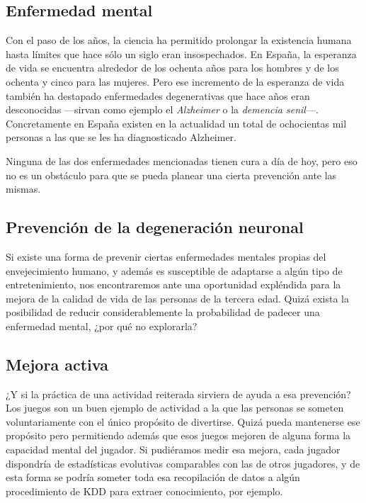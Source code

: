 \subsection{Enfermedad mental}

Con el paso de los años, la ciencia ha permitido prolongar la existencia humana hasta límites que hace sólo un siglo eran insospechados. En España, la esperanza de vida se encuentra alrededor de los ochenta años para los hombres y de los ochenta y cinco para las mujeres. Pero ese incremento de la esperanza de vida también ha destapado enfermedades degenerativas que hace años eran desconocidas ---sirvan como ejemplo el {\it Alzheimer} o la {\it demencia senil}---. Concretamente en España existen en la actualidad un total de ochocientas mil personas a las que se les ha diagnosticado Alzheimer.

Ninguna de las dos enfermedades mencionadas tienen cura a día de hoy, pero eso no es un obstáculo para que se pueda planear una cierta prevención ante las mismas.

\subsection{Prevención de la degeneración neuronal}

Si existe una forma de prevenir ciertas enfermedades mentales propias del envejecimiento humano, y además es susceptible de adaptarse a algún tipo de entretenimiento, nos encontraremos ante una oportunidad expléndida para la mejora de la calidad de vida de las personas de la tercera edad. Quizá exista la posibilidad de reducir considerablemente la probabilidad de padecer una enfermedad mental, ¿por qué no explorarla?

\subsection{Mejora activa}

¿Y si la práctica de una actividad reiterada sirviera de ayuda a esa prevención? Los juegos son un buen ejemplo de actividad a la que las personas se someten voluntariamente con el único propósito de divertirse. Quizá pueda mantenerse ese propósito pero permitiendo además que esos juegos mejoren de alguna forma la capacidad mental del jugador. Si pudiéramos medir esa mejora, cada jugador dispondría de estadísticas evolutivas comparables con las de otros jugadores, y de esta forma se podría someter toda esa recopilación de datos a algún procedimiento de \acf{KDD} para extraer conocimiento, por ejemplo.

